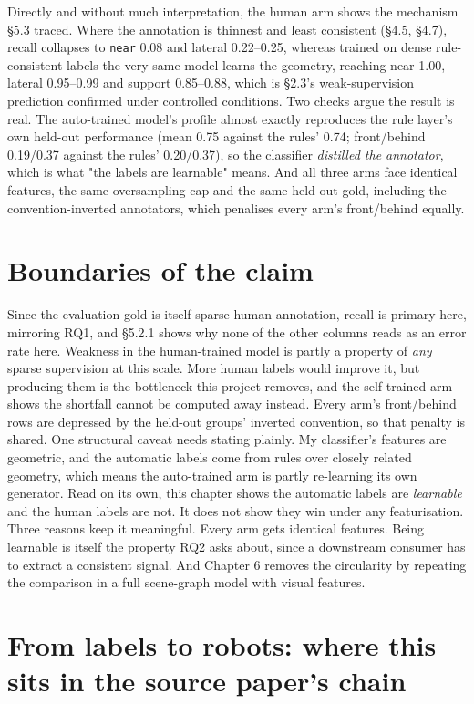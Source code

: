 Directly and without much interpretation, the human arm shows the mechanism \S{}5.3 traced. Where the annotation is thinnest and least consistent (\S{}4.5, \S{}4.7), recall collapses to \texttt{near} 0.08 and lateral 0.22--0.25, whereas trained on dense rule-consistent labels the very same model learns the geometry, reaching near 1.00, lateral 0.95--0.99 and support 0.85--0.88, which is \S{}2.3's weak-supervision prediction confirmed under controlled conditions. Two checks argue the result is real. The auto-trained model's profile almost exactly reproduces the rule layer's own held-out performance (mean 0.75 against the rules' 0.74; front/behind 0.19/0.37 against the rules' 0.20/0.37), so the classifier \textit{distilled the annotator}, which is what "the labels are learnable" means. And all three arms face identical features, the same oversampling cap and the same held-out gold, including the convention-inverted annotators, which penalises every arm's front/behind equally.

\section{Boundaries of the claim}

Since the evaluation gold is itself sparse human annotation, recall is primary here, mirroring RQ1, and \S{}5.2.1 shows why none of the other columns reads as an error rate here. Weakness in the human-trained model is partly a property of \textit{any} sparse supervision at this scale. More human labels would improve it, but producing them is the bottleneck this project removes, and the self-trained arm shows the shortfall cannot be computed away instead. Every arm's front/behind rows are depressed by the held-out groups' inverted convention, so that penalty is shared. One structural caveat needs stating plainly. My classifier's features are geometric, and the automatic labels come from rules over closely related geometry, which means the auto-trained arm is partly re-learning its own generator. Read on its own, this chapter shows the automatic labels are \textit{learnable} and the human labels are not. It does not show they win under any featurisation. Three reasons keep it meaningful. Every arm gets identical features. Being learnable is itself the property RQ2 asks about, since a downstream consumer has to extract a consistent signal. And Chapter 6 removes the circularity by repeating the comparison in a full scene-graph model with visual features.

\section{From labels to robots: where this sits in the source paper's chain}

